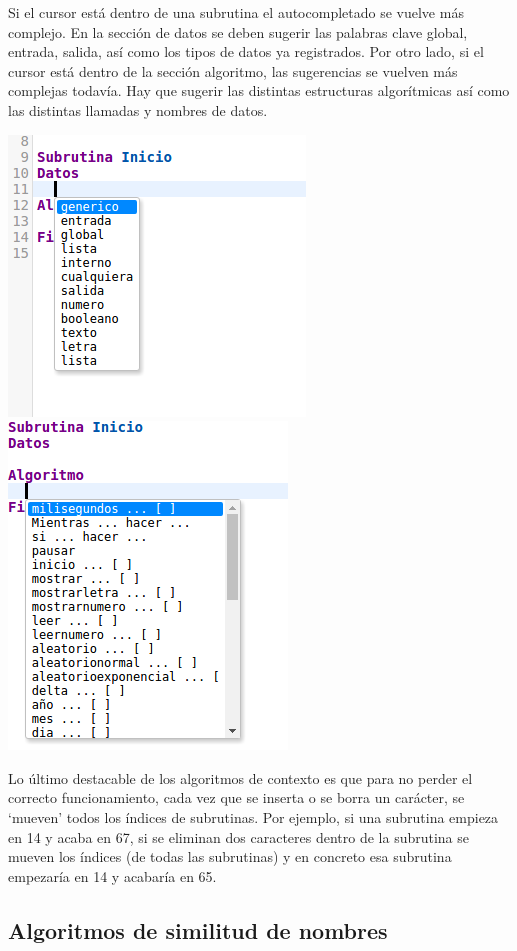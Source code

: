 \documentclass{report}
\begin{document}
	\vspace{10px}
	
	Si el cursor está dentro de una subrutina el autocompletado se vuelve más complejo. En la sección de datos se deben sugerir las palabras clave global, entrada, salida, así como los tipos de datos ya registrados. Por otro lado, si el cursor está dentro de la sección algoritmo, las sugerencias se vuelven más complejas todavía. Hay que sugerir las distintas estructuras algorítmicas así como las distintas llamadas y nombres de datos.
	
	\begin{center}
	\includegraphics[width=0.45\linewidth]{autocompletado2}
	\includegraphics[width=0.35\linewidth]{autocompletado3}
	\end{center}
	
	\vspace{10px}
	
	Lo último destacable de los algoritmos de contexto es que para no perder el correcto funcionamiento, cada vez que se inserta o se borra un carácter, se `mueven' todos los índices de subrutinas. Por ejemplo, si una subrutina empieza en 14 y acaba en 67, si se eliminan dos caracteres dentro de la subrutina se mueven los índices (de todas las subrutinas) y en concreto esa subrutina empezaría en 14 y acabaría en 65.
		
	
	
	\subsection{Algoritmos de similitud de nombres}
	
\end{document}
